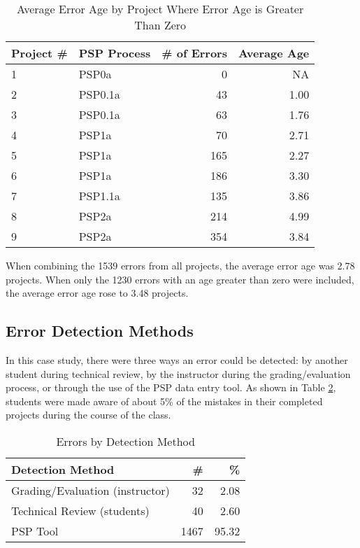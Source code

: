 \begin{table} [htb] 
\begin{center}
\caption{\label{table:errorsAgeSig}
Average Error Age by Project Where Error Age is Greater Than Zero}
\begin{tabular}{|l|l|r|r|}\hline  
Project \# & PSP Process & \# of Errors & Average Age \\ \hline\hline 
1 & PSP0a   &   0  &    NA \\ \hline
2 & PSP0.1a &  43  &  1.00 \\ \hline
3 & PSP0.1a &  63  &  1.76 \\ \hline
4 & PSP1a   &  70  &  2.71 \\ \hline
5 & PSP1a   & 165  &  2.27 \\ \hline
6 & PSP1a   & 186  &  3.30 \\ \hline
7 & PSP1.1a & 135  &  3.86 \\ \hline
8 & PSP2a   & 214  &  4.99 \\ \hline
9 & PSP2a   & 354  &  3.84 \\ \hline
\end{tabular}
\end{center}
\end{table} 

When combining the 1539 errors from all projects, the average error age was
2.78 projects.  When only the 1230 errors with an age greater than zero
were included, the average error age rose to 3.48 projects.

\subsection{Error Detection Methods}
In this case study, there were three ways an error could be detected: by
another student during technical review, by the instructor during the
grading/evaluation process, or through the use of the PSP data entry tool.
As shown in Table \ref{table:errorsByDetect}, students were made aware of about
5\% of the mistakes in their completed projects during the course of the
class.

\begin{table} [ht]
\begin{center}
\caption{\label{table:errorsByDetect}Errors by Detection Method} 
\begin{tabular}{|l|r|r|}\hline 
Detection Method & \# & \% \\ \hline\hline 
Grading/Evaluation (instructor) &   32 &  2.08  \\ \hline
Technical Review   (students)   &   40 &  2.60  \\ \hline
PSP Tool                        & 1467 & 95.32 \\ \hline
\end{tabular}
\end{center}
\end{table}

